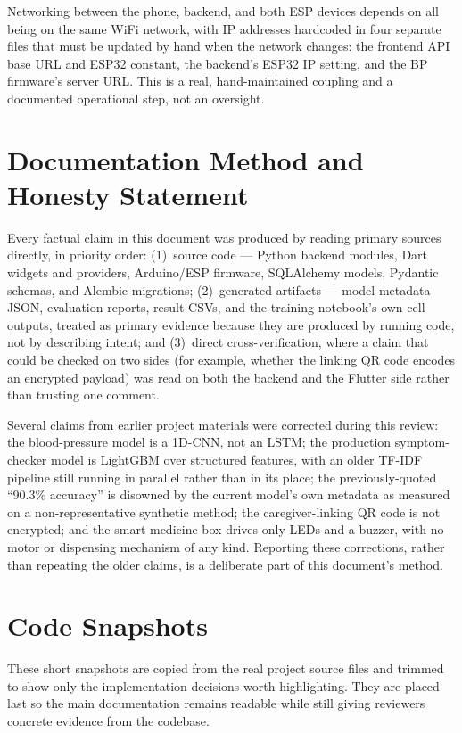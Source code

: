 \documentclass[12pt,a4paper]{report}
\begin{document}
Networking between the phone, backend, and both ESP devices depends on all being
on the same WiFi network, with IP addresses hardcoded in four separate files
that must be updated by hand when the network changes: the frontend API base URL
and ESP32 constant, the backend's ESP32 IP setting, and the BP firmware's server
URL. This is a real, hand-maintained coupling and a documented operational step,
not an oversight.

\chapter{Documentation Method and Honesty Statement}

Every factual claim in this document was produced by reading primary sources
directly, in priority order: (1)~source code --- Python backend modules, Dart
widgets and providers, Arduino/ESP firmware, SQLAlchemy models, Pydantic
schemas, and Alembic migrations; (2)~generated artifacts --- model metadata
JSON, evaluation reports, result CSVs, and the training notebook's own cell
outputs, treated as primary evidence because they are produced by running code,
not by describing intent; and (3)~direct cross-verification, where a claim that
could be checked on two sides (for example, whether the linking QR code encodes
an encrypted payload) was read on both the backend and the Flutter side rather
than trusting one comment.

Several claims from earlier project materials were corrected during this review:
the blood-pressure model is a 1D-CNN, not an LSTM; the production symptom-checker
model is LightGBM over structured features, with an older TF-IDF pipeline still
running in parallel rather than in its place; the previously-quoted ``90.3\%
accuracy'' is disowned by the current model's own metadata as measured on a
non-representative synthetic method; the caregiver-linking QR code is not
encrypted; and the smart medicine box drives only LEDs and a buzzer, with no
motor or dispensing mechanism of any kind. Reporting these corrections, rather
than repeating the older claims, is a deliberate part of this document's method.

\chapter{Code Snapshots}

These short snapshots are copied from the real project source files and trimmed
to show only the implementation decisions worth highlighting. They are placed
last so the main documentation remains readable while still giving reviewers
concrete evidence from the codebase.
\end{document}
